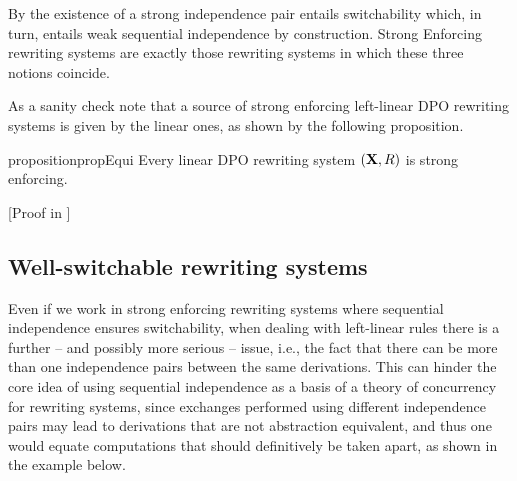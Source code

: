 \documentclass[a4paper,UKenglish,cleveref,pdftex,thm-restate,numberwithinsect,anonymous]{lipics}
\def\R{\mathsf{R}}
\def\X{\textbf {\textup{X}}}
\newcommand{\rem}[2]{{\color{blue}#1}{\color{red}#2}}
\renewcommand{\rem}[2]{}
\begin{document}
\begin{remark}
  By  the existence of a strong independence pair
  entails switchability which, in turn, entails weak sequential
  independence by construction. Strong Enforcing rewriting systems are exactly
  those rewriting systems in which these three notions coincide.
\end{remark}




As a sanity check note that a source of strong enforcing left-linear DPO rewriting systems is given by the linear ones, as shown by the following proposition.

\begin{restatable}{proposition}{propEqui}
  \label{prop:equi}
  Every linear DPO rewriting system $(\X, \R)$ is strong enforcing.
\end{restatable}
[Proof in ]

\subsection{Well-switchable rewriting systems}\label{subsec:verytame}

Even if we work in strong enforcing rewriting systems where sequential
independence ensures switchability, when dealing with left-linear
rules there is a further -- and possibly more serious -- issue, i.e.,
the fact that there can be more than one independence pairs between
the same derivations. This can hinder the core idea of using
sequential independence as a basis of a theory of concurrency for
rewriting systems, since exchanges performed using different
independence pairs may lead to derivations that are not abstraction
equivalent, and thus one would equate computations that should
definitively be taken apart, as shown in the example below.
\end{document}
